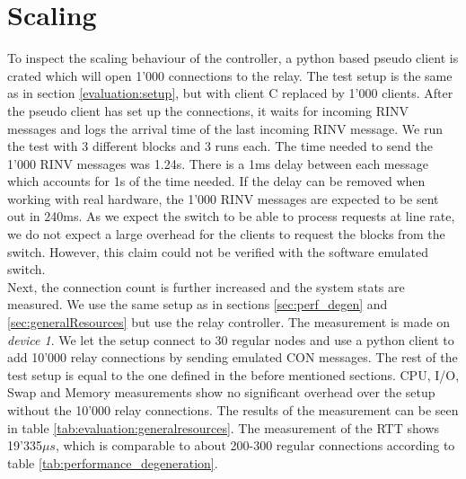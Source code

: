 

\section{Scaling \label{evaluation:scaling}}
To inspect the scaling behaviour of the controller, a python based pseudo client is crated which will open 1'000 connections to the relay. The test setup is the same as in section \ref{evaluation:setup}, but with client C replaced by 1'000 clients. After the pseudo client has set up the connections, it waits for incoming RINV messages and logs the arrival time of the last incoming RINV message. We run the test with 3 different blocks and 3 runs each. The time needed to send the 1'000 RINV messages was 1.24s. There is a 1ms delay between each message which accounts for 1s of the time needed. If the delay can be removed when working with real hardware, the 1'000 RINV messages are expected to be sent out in 240ms. As we expect the switch to be able to process requests at line rate, we do not expect a large overhead for the clients to request the blocks from the switch. However, this claim could not be verified with the software emulated switch.\\
Next, the connection count is further increased and the system stats are measured. We use the same setup as in sections \ref{sec:perf_degen} and \ref{sec:generalResources} but use the relay controller. The measurement is made on \textit{device 1}. We let the setup connect to 30 regular nodes  and use a python client to add 10'000 relay connections by sending emulated CON messages. The rest of the test setup is equal to the one defined in the before mentioned sections. CPU, I/O, Swap and Memory measurements show no significant overhead over the setup without the 10'000 relay connections. The results of the measurement can be seen in table \ref{tab:evaluation:generalresources}. The measurement of the RTT shows 19'335$\mu s$, which is comparable to about 200-300 regular connections according to table \ref{tab:performance_degeneration}.








